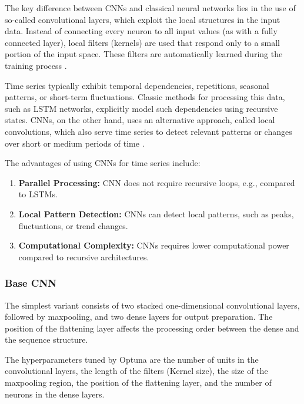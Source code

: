 The key difference between CNNs and classical neural networks lies in the use of so-called convolutional layers, which exploit the local structures in the input data.
Instead of connecting every neuron to all input values (as with a fully connected layer), local filters (kernels) are used that respond only to a small portion of the input space.
These filters are automatically learned during the training process \cite{cnn-for-time-series}.

Time series typically exhibit temporal dependencies, repetitions, seasonal patterns, or short-term fluctuations.
Classic methods for processing this data, such as LSTM networks, explicitly model such dependencies using recursive states.
CNNs, on the other hand, uses an alternative approach, called local convolutions, which also serve time series to detect relevant patterns or changes over short or medium periods of time \cite{cnn-local-convolution}.

The advantages of using CNNs for time series include:

\begin{enumerate}
    \item \textbf{Parallel Processing:} CNN does not require recursive loops, e.g., compared to LSTMs.
    \item \textbf{Local Pattern Detection:} CNNs can detect local patterns, such as peaks, fluctuations, or trend changes.
    \item \textbf{Computational Complexity:} CNNs requires lower computational power compared to recursive architectures.
\end{enumerate}

\subsubsection{Base CNN}

The simplest variant consists of two stacked one-dimensional convolutional layers, followed by maxpooling, and two dense layers for output preparation.
The position of the flattening layer affects the processing order between the dense and the sequence structure.

The hyperparameters tuned by Optuna are the number of units in the convolutional layers, the length of the filters (Kernel size), the size of the maxpooling region, the position of the flattening layer, and the number of neurons in the dense layers.




